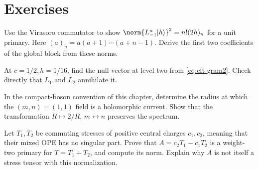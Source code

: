 \section{Exercises}

\begin{exercise}\label{ex:cft-level1}
Use the Virasoro commutator to show
$\norm{L_{-1}^n|h\rangle}^2=n!(2h)_n$ for a unit primary.
Here $(a)_n=a(a+1)\cdots(a+n-1)$. Derive the first two coefficients
of the global block from these norms.

\par\smallskip{}\par
\end{exercise}

\begin{exercise}\label{ex:cft-null}
At $c=1/2,h=1/16$, find the null vector at level two from
\eqref{eq:cft-gram2}. Check directly that $L_1$ and $L_2$ annihilate it.

\par\smallskip{}\par
\end{exercise}

\begin{exercise}\label{ex:cft-compact}
In the compact-boson convention of this chapter, determine the radius
at which the $(m,n)=(1,1)$ field is a holomorphic current. Show that
the transformation $R\mapsto2/R$, $m\leftrightarrow n$ preserves
the spectrum.

\par\smallskip{}\par
\end{exercise}

\begin{exercise}\label{ex:cft-stress-combination}
Let $T_1,T_2$ be commuting stresses of positive central charges
$c_1,c_2$, meaning that their mixed OPE has no singular part.
Prove that $A=c_2T_1-c_1T_2$ is a weight-two primary
for $T=T_1+T_2$, and compute its norm. Explain why $A$ is not
itself a stress tensor with this normalization.

\par\smallskip{}\par
\end{exercise}


